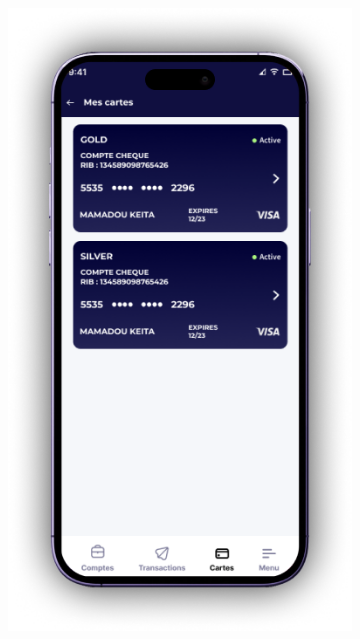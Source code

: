 \newpage

\begin{figure}[!ht]
    \centering
    \begin{subfigure}[b]{0.49\textwidth}
        \centering
        \includegraphics[width=\textwidth]{images/screens/mobileApp/device/Cards Home D.png}
    \end{subfigure}
    \hfill
    \begin{subfigure}[b]{0.49\textwidth}

\end{subfigure}
\end{figure}
